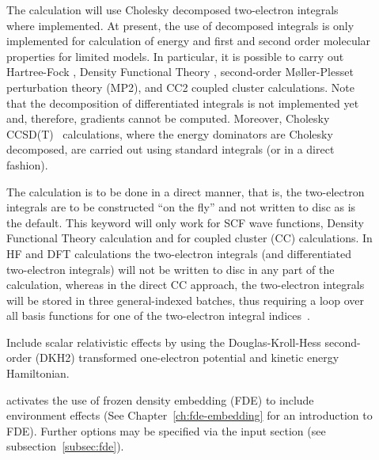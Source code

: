 \begin{description}

\item[] The calculation will use Cholesky decomposed two-electron
integrals~\cite{choint} where implemented.
At present, the use of decomposed integrals is only implemented for calculation of energy and
first and second order molecular properties for limited models.
In particular, it is possible to carry out Hartree-Fock
,
Density Functional Theory
,
second-order M{\o}ller-Plesset perturbation theory
(MP2), and
CC2 coupled cluster calculations. Note that
the decomposition of differentiated integrals is not implemented yet and, therefore,
gradients cannot be computed. Moreover, Cholesky CCSD(T)~
calculations, where the energy dominators are Cholesky decomposed,
are carried out using standard integrals (or in a direct fashion).


\item[] The calculation is to be done in a direct
manner, that
is, the two-electron integrals are to be
constructed ``on the fly''
and not written to disc as is the default. This keyword will only work
for SCF wave functions,
Density Functional Theory
calculation and for
coupled cluster (CC) calculations. In
HF and DFT calculations the
two-electron integrals (and differentiated
two-electron integrals) will not be written to disc in any part of the
calculation, whereas in the direct CC approach, the two-electron
integrals will be stored in three general-indexed batches, thus
requiring a loop over all basis functions for one of the two-electron
integral indices~\cite{directCC}.

\item[] Include scalar relativistic effects by using the
Douglas-Kroll-Hess second-order (DKH2) transformed one-electron potential and kinetic energy Hamiltonian.

\item[] activates the use of frozen density embedding (FDE) to include environment effects
(See Chapter~\ref{ch:fde-embedding} for an introduction to FDE). Further options may be specified via
the  input section (see subsection~\ref{subsec:fde}).   
   
   



\end{description}
